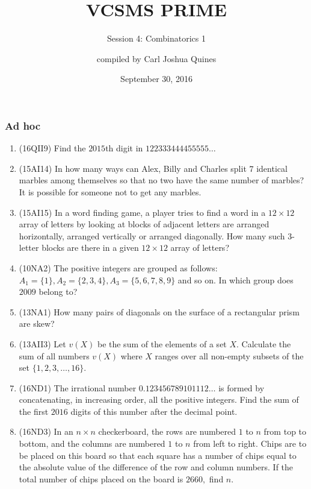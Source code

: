 \documentclass[10pt,paper=letter]{scrartcl}
\begin{document}
\title{VCSMS PRIME}
\subtitle{Session 4: Combinatorics 1}
\author{compiled by Carl Joshua Quines}
\date{September 30, 2016}

\maketitle

\subsubsection*{Ad hoc}

\begin{enumerate}

\item (16QII9) Find the $2015$th digit in $122333444455555\ldots$

\item (15AI14) In how many ways can Alex, Billy and Charles split $7$ identical marbles among themselves so that no two have the same number of marbles? It is possible for someone not to get any marbles.

\item (15AI15) In a word finding game, a player tries to find a word in a $12 \times 12$ array of letters by looking at blocks of adjacent letters are arranged horizontally, arranged vertically or arranged diagonally. How many such $3$-letter blocks are there in a given $12\times 12$ array of letters?

\item (10NA2) The positive integers are grouped as follows: $A_1 = \{1\}, A_2 = \{2, 3, 4\}, A_3 = \{5, 6, 7, 8, 9\}$ and so on. In which group does $2009$ belong to?

\item (13NA1) How many pairs of diagonals on the surface of a rectangular prism are skew?

\item (13AII3) Let $v(X)$ be the sum of the elements of a set $X$. Calculate the sum of all numbers $v(X)$ where $X$ ranges over all non-empty subsets of the set $\{1,2,3,\ldots,16\}$.

\item (16ND1) The irrational number $0.123456789101112\ldots$ is formed by concatenating, in increasing order, all the positive integers. Find the sum of the first $2016$ digits of this number after the decimal point.

\item (16ND3) In an $n \times n$ checkerboard, the rows are numbered $1$ to $n$ from top to bottom, and the columns are numbered $1$ to $n$ from left to right. Chips are to be placed on this board so that each square has a number of chips equal to the absolute value of the difference of the row and column numbers. If the total number of chips placed on the board is $2660,$ find $n$.


\end{enumerate}
\end{document}
